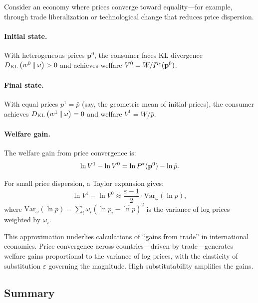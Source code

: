 Consider an economy where prices converge toward equality---for example, through trade liberalization or technological change that reduces price dispersion.

\paragraph{Initial state.}
With heterogeneous prices $\mathbf{p}^0$, the consumer faces KL divergence $D_{\mathrm{KL}}\left(w^0 \,\|\, \omega\right) > 0$ and achieves welfare $V^0 = W/P^{*}(\mathbf{p}^0)$.

\paragraph{Final state.}
With equal prices $p^1 = \bar{p}$ (say, the geometric mean of initial prices), the consumer achieves $D_{\mathrm{KL}}\left(w^1 \,\|\, \omega\right) = 0$ and welfare $V^1 = W/\bar{p}$.

\paragraph{Welfare gain.}
The welfare gain from price convergence is:
\begin{equation}
\ln V^1 - \ln V^0 = \ln P^{*}(\mathbf{p}^0) - \ln \bar{p}.
\end{equation}

For small price dispersion, a Taylor expansion gives:
\begin{equation}
\ln V^1 - \ln V^0 \approx \frac{\varepsilon - 1}{2} \cdot \text{Var}_\omega(\ln p),
\end{equation}
where $\text{Var}_\omega(\ln p) = \sum_i \omega_i (\ln p_i - \overline{\ln p})^2$ is the variance of log prices weighted by $\omega_i$.

\begin{calloutnote}
This approximation underlies calculations of ``gains from trade'' in international economics. Price convergence across countries---driven by trade---generates welfare gains proportional to the variance of log prices, with the elasticity of substitution $\varepsilon$ governing the magnitude. High substitutability amplifies the gains.
\end{calloutnote}

\subsection{Summary}
\label{subsec:kl-summary}

